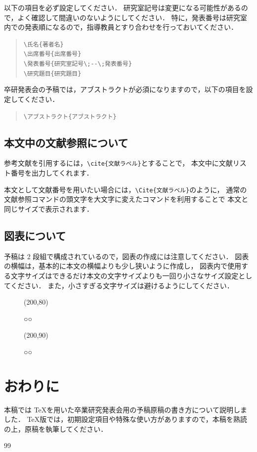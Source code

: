 \documentclass[twoside,twocolumn]{ujarticle}
\begin{document}
以下の項目を必ず設定してください．
研究室記号は変更になる可能性があるので，よく確認して間違いのないようにしてください．
特に，発表番号は研究室内での発表順になるので，指導教員とすり合わせを行っておいてください．
%
\begin{quote}
  \verb|\氏名{著者名}| \\
  \verb|\出席番号{出席番号}| \\
  \verb|\発表番号{研究室記号\;--\;発表番号}| \\
  \verb|\研究題目{研究題目}|
\end{quote}
%
卒研発表会の予稿では，アブストラクトが必須になりますので，以下の項目を設定してください．
%
\begin{quote}
  \verb|\アブストラクト{アブストラクト}|
\end{quote}
%
%
%
\subsection{本文中の文献参照について}
%
参考文献を引用するには，\verb|\cite{文献ラベル}|とすることで，
本文中に文献リスト番号を出力してくれます．

本文として文献番号を用いたい場合には，\verb|\Cite{文献ラベル}|のように，
通常の文献参照コマンドの頭文字を大文字に変えたコマンドを利用することで
本文と同じサイズで表示されます．
%
%
\subsection{図表について}
%
予稿は 2 段組で構成されているので，図表の作成には注意してください．
図表の横幅は，基本的に本文の横幅よりも少し狭いように作成し，
図表内で使用する文字サイズはできるだけ本文の文字サイズよりも一回り小さなサイズ設定としてください．
また，小さすぎる文字サイズは避けるようにしてください．
%
\begin{figure}[h!]
  \centering
    \framebox(200,80){}
    \caption{○○}
  \label{fig:ex_fig1}
\end{figure}
%
%
\begin{figure}[h!]
  \centering
    \framebox(200,90){}
    \caption{○○}
  \label{fig:ex_fig2}
\end{figure}
%
%
%
\section{おわりに}
本稿では \TeX を用いた卒業研究発表会用の予稿原稿の書き方について説明しました．
\TeX 版では，初期設定項目や特殊な使い方がありますので，本稿を熟読の上，原稿を執筆してください．
%
%

\begin{thebibliography}{99}
\small{
}
\end{thebibliography}
\end{document}
